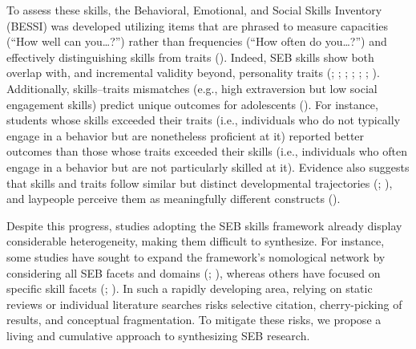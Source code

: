 \documentclass[
  man,
  longtable,
  nolmodern,
  notxfonts,
  notimes,
  colorlinks=true,linkcolor=blue,citecolor=blue,urlcolor=blue]{apa7}
\begin{document}
To assess these skills, the Behavioral, Emotional, and Social Skills
Inventory (BESSI) was developed utilizing items that are phrased to
measure capacities (``How well can you\ldots?'') rather than frequencies
(``How often do you\ldots?'') and effectively distinguishing skills from
traits (). Indeed, SEB skills show both overlap with, and
incremental validity beyond, personality traits
(;
; ; ; ;
;
).
Additionally, skills--traits mismatches (e.g., high extraversion but low
social engagement skills) predict unique outcomes for adolescents
(). For
instance, students whose skills exceeded their traits (i.e., individuals
who do not typically engage in a behavior but are nonetheless proficient
at it) reported better outcomes than those whose traits exceeded their
skills (i.e., individuals who often engage in a behavior but are not
particularly skilled at it). Evidence also suggests that skills and
traits follow similar but distinct developmental trajectories
(;
), and laypeople perceive them as meaningfully different constructs
().

Despite this progress, studies adopting the SEB skills framework already
display considerable heterogeneity, making them difficult to synthesize.
For instance, some studies have sought to expand the framework's
nomological network by considering all SEB facets and domains
(; ),
whereas others have focused on specific skill facets
(;
). In such a rapidly
developing area, relying on static reviews or individual literature
searches risks selective citation, cherry-picking of results, and
conceptual fragmentation. To mitigate these risks, we propose a living
and cumulative approach to synthesizing SEB research.
\end{document}
